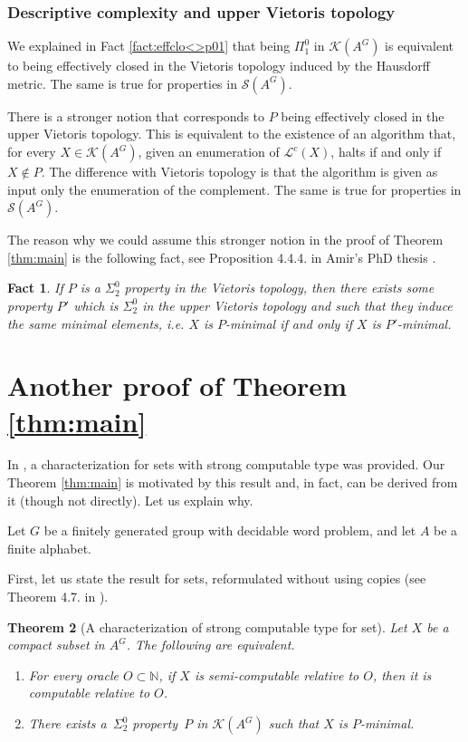 \documentclass[french,american]{article}
\theoremstyle{plain}
\newtheorem{theorem}{Theorem}[section]
\theoremstyle{definition}
\theoremstyle{remark}
\theoremstyle{plain}
\newtheorem{fact}[theorem]{Fact}
\begin{document}
\subsubsection{Descriptive complexity and upper Vietoris topology}\label{subsec:Another-definition-of}

We explained in Fact \ref{fact:effclo<>p01}
that being $\Pi_{1}^{0}$ in $\mathcal{K}(A^{G})$ is equivalent to
being effectively closed in the Vietoris topology induced by the Hausdorff
metric. The same is true for properties
in $\mathcal{S}(A^{G})$.

There is a stronger notion that corresponds to $P$ being effectively closed in the upper Vietoris topology.
This is equivalent to the existence of an algorithm that, for
every $X\in\mathcal{K}(A^{G})$, given an enumeration
of $\mathcal{L}^{c}(X)$, halts if and only if $X\notin P$. The difference with Vietoris topology is that the algorithm is given as input only the enumeration of the complement.
The same is true for properties in $\mathcal{S}(A^{G})$.

The reason why we could assume this stronger notion in the proof of Theorem \ref{thm:main}
is the following fact, see Proposition 4.4.4. in Amir's PhD thesis
\cite{Phdamir2024}. 
\begin{fact}
\label{fact:PinV<>PinupV}If
$P$ is a $\Sigma_{2}^{0}$ property in the Vietoris topology, then
there exists some property $P'$ which is $\Sigma_{2}^{0}$ in the
upper Vietoris topology and such that they induce the same minimal
elements, i.e. $X$ is $P$-minimal if and only if $X$ is $P'$-minimal.
\end{fact}


\section{Another proof of Theorem \ref{thm:main}}\label{Appendix:Another-proof-of}

In \cite{AH22c}, a characterization for sets with strong computable
type was provided. Our Theorem \ref{thm:main} is motivated
by this result and, in fact, can be derived from it (though not directly).
Let us explain why.

Let $G$ be a finitely generated group with  decidable word problem,
and let $A$ be a finite alphabet.

First, let us state the result for sets, reformulated without using
copies (see Theorem 4.7. in \cite{AH22c}).
\begin{theorem}[A characterization of strong computable type for set]
\label{thm:SCTforsets}Let $X$ be a compact
subset in $A^{G}$. The following are equivalent.
\begin{enumerate}
\item For every oracle $O\subset\mathbb{N}$, if $X$ is semi-computable
relative to $O$, then it is computable relative to $O$.
\item There exists a~$\Sigma_{2}^{0}$ property~$P$ in $\mathcal{K}(A^{G})$
such that $X$ is $P$-minimal.
\end{enumerate}
\end{theorem}
\end{document}
